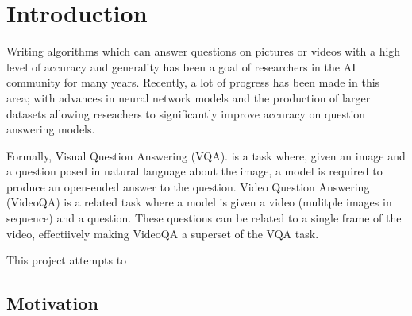 


\section{Introduction}

Writing algorithms which can answer questions on pictures or videos with a high level of accuracy and generality has been a goal of researchers in the AI community for many years. Recently, a lot of progress has been made in this area; with advances in neural network models and the production of larger datasets allowing reseachers to significantly improve accuracy on question answering models.

Formally, Visual Question Answering (VQA)\cite{2017vqa}. is a task where, given an image and a question posed in natural language about the image, a model is required to produce an open-ended answer to the question. Video Question Answering (VideoQA) is a related task where a model is given a video (mulitple images in sequence) and a question. These questions can be related to a single frame of the video, effectiively making VideoQA a superset of the VQA task.

This project attempts to


\subsection{Motivation}





